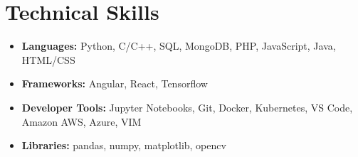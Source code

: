 \documentclass[hidelinks,letterpaper,10pt]{article}
\newcommand{\resumeSubHeadingListStart}{\begin{itemize}[leftmargin=*,label={}]}
\newcommand{\resumeSubHeadingListEnd}{\end{itemize}}
\begin{document}
\section{Technical Skills}
\resumeSubHeadingListStart
\itemsep=-0.4em
\item {\textbf{Languages:} Python, C/C++, SQL, MongoDB, PHP, JavaScript, Java, HTML/CSS}
\item {\textbf{Frameworks:} Angular, React, Tensorflow}
\item {\textbf{Developer Tools:} Jupyter Notebooks, Git, Docker, Kubernetes, VS Code, Amazon AWS, Azure, VIM}
\item {\textbf{Libraries:} pandas, numpy, matplotlib, opencv}
\resumeSubHeadingListEnd
\end{document}
